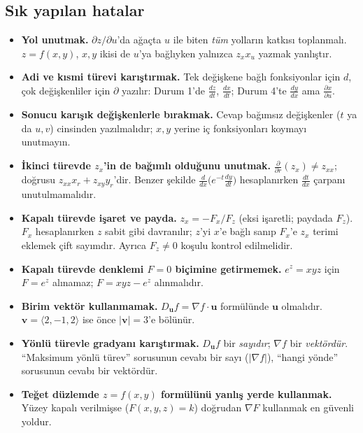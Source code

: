 \subsection{Sık yapılan hatalar}

\begin{dikkat}
\begin{itemize}
  \item \textbf{Yol unutmak.} $\partial z/\partial u$'da ağaçta $u$ ile biten \emph{tüm} yolların katkısı toplanmalı.
        $z=f(x,y)$, $x,y$ ikisi de $u$'ya bağlıyken yalnızca $z_xx_u$ yazmak yanlıştır.
  \item \textbf{Adi ve kısmi türevi karıştırmak.} Tek değişkene bağlı fonksiyonlar için $d$, çok değişkenliler için
        $\partial$ yazılır: Durum 1'de $\frac{dz}{dt}$, $\frac{dx}{dt}$; Durum 4'te $\frac{dy}{dx}$ ama $\frac{\partial x}{\partial u}$.
  \item \textbf{Sonucu karışık değişkenlerle bırakmak.} Cevap bağımsız değişkenler ($t$ ya da $u,v$) cinsinden yazılmalıdır;
        $x,y$ yerine iç fonksiyonları koymayı unutmayın.
  \item \textbf{İkinci türevde $z_x$'in de bağımlı olduğunu unutmak.} $\frac{\partial}{\partial r}(z_x)\ne z_{xx}$;
        doğrusu $z_{xx}x_r+z_{xy}y_r$'dir. Benzer şekilde $\frac{d}{dx}\big(e^{-t}\frac{dy}{dt}\big)$ hesaplanırken
        $\frac{dt}{dx}$ çarpanı unutulmamalıdır.
  \item \textbf{Kapalı türevde işaret ve payda.} $z_x=-F_x/F_z$ (eksi işaretli; paydada $F_z$). $F_x$ hesaplanırken $z$
        sabit gibi davranılır; $z$'yi $x$'e bağlı sanıp $F_x$'e $z_x$ terimi eklemek çift sayımdır. Ayrıca $F_z\ne0$
        koşulu kontrol edilmelidir.
  \item \textbf{Kapalı türevde denklemi $F=0$ biçimine getirmemek.} $e^z=xyz$ için $F=e^z$ alınamaz; $F=xyz-e^z$ alınmalıdır.
  \item \textbf{Birim vektör kullanmamak.} $D_{\mathbf u}f=\nabla f\cdot\mathbf u$ formülünde $\mathbf u$ 
        olmalıdır. $\mathbf v=\langle2,-1,2\rangle$ ise önce $|\mathbf v|=3$'e bölünür.
  \item \textbf{Yönlü türevle gradyanı karıştırmak.} $D_{\mathbf u}f$ bir \emph{sayıdır}; $\nabla f$ bir \emph{vektördür}.
        ``Maksimum yönlü türev'' sorusunun cevabı bir sayı ($|\nabla f|$), ``hangi yönde'' sorusunun cevabı bir vektördür.
  \item \textbf{Teğet düzlemde $z=f(x,y)$ formülünü yanlış yerde kullanmak.} Yüzey kapalı verilmişse ($F(x,y,z)=k$)
        doğrudan $\nabla F$ kullanmak en güvenli yoldur.
\end{itemize}
\end{dikkat}

